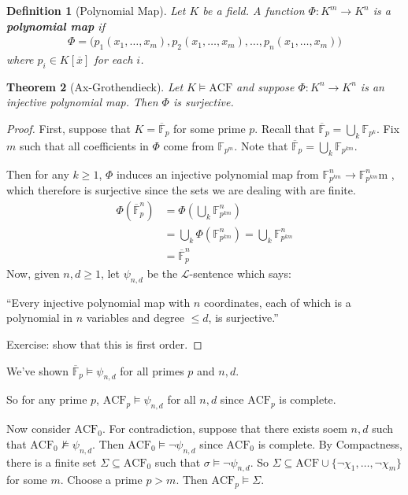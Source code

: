\documentclass[]{article}
\theoremstyle{custhm}
\newtheorem{theorem}{Theorem}[section]
\theoremstyle{cusdef}
\newtheorem{defin}[theorem]{Definition}
\theoremstyle{custhm}
\theoremstyle{custhm}
\theoremstyle{custhm}
\theoremstyle{ex}
\theoremstyle{custhm}
\theoremstyle{cusdef}
\theoremstyle{remark}
\theoremstyle{remark}
\newcommand{\ra}{\rightarrow}
\newcommand{\undf}[1]{\textit{\textbf{#1}}}
\renewcommand{\L}{\mathcal{L}}
\renewcommand{\bar}{\overline}
\newcommand{\acf}{\textrm{ACF}}
\newcommand{\F}{\mathbb{F}}
\renewcommand{\subset}{\subseteq}
\begin{document}
\begin{defin}[Polynomial Map]
Let $K$ be a field. A function $\Phi: K^m\ra K^n$ is a \undf{polynomial map} if
\begin{align*}
\Phi = \big(p_1(x_1,\dots,x_m),p_2(x_1,\dots,x_m),\dots,p_n(x_1,\dots,x_m)\big)
\end{align*}
where $p_i \in K[\bar{x}]$ for each $i$.
\end{defin}
\begin{theorem}[Ax-Grothendieck]
Let $K\models \acf$ and suppose $\Phi:K^n\ra K^n$ is an injective polynomial map. Then $\Phi$ is surjective.
\end{theorem}
\begin{proof}
First, suppose that $K = \bar{\mathbb{F}}_p$ for some prime $p$. Recall that $\bar{\mathbb{F}}_p = \bigcup_k \mathbb{F}_{p^k}$. Fix $m$ such that all coefficients in $\Phi$ come from $\mathbb{F}_{p^m}$. Note that $\bar{\mathbb{F}}_p = \bigcup_k \mathbb{F}_{p^{km}}$.

Then for any $k\ge 1$, $\Phi$ induces an injective polynomial map from $\mathbb{F}_{p^{km}}^n \ra \mathbb{F}_{p^{km}}^n$m , which therefore is surjective since the sets we are dealing with are finite.
\begin{align*}
\Phi\left(\bar{\mathbb{F}}_p^n\right) &= \Phi\left(\bigcup_k\mathbb{F}_{p^{km}}^n\right)\\
&= \bigcup_k\Phi\left(\mathbb{F}_{p^{km}}^n\right) = \bigcup_k\mathbb{F}_{p^{km}}^n\\
&=\bar{\mathbb{F}}_p^n
\end{align*}
Now, given $n,d\ge 1$, let $\psi_{n,d}$ be the $\L$-sentence which says:

``Every injective polynomial map with $n$ coordinates, each of which is a polynomial in $n$ variables and degree $\le d$, is surjective.''

Exercise: show that this is first order.
\end{proof}

We've shown $\bar{\F}_p \models \psi_{n,d}$ for all primes $p$ and $n,d$.

So for any prime $p$, $\acf_p\models\psi_{n,d}$ for all $n,d$ since $\acf_p$ is complete.

Now consider $\acf_0$. For contradiction, suppose that there exists soem $n,d$ such that $\acf_0\not\models\psi_{n,d}$. Then $\acf_0\models\neg\psi_{n,d}$ since $\acf_0$ is complete. By Compactness, there is a finite set $\Sigma\subset \acf_0$ such that $\sigma \models \neg \psi_{n,d}$. So $\Sigma\subset \acf\cup\{\neg\chi_1,\dots,\neg\chi_m\}$ for some $m$. Choose a prime $p > m$. Then $\acf_p\models \Sigma$.
\end{document}
